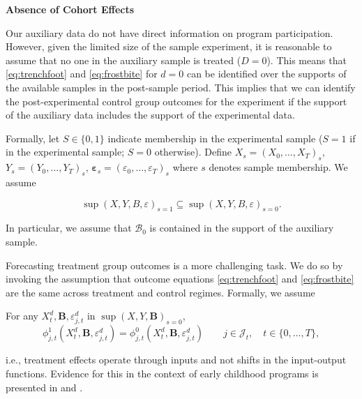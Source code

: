 \begin{assumption}\label{ass:crotchrot}
\textbf{Absence of Cohort Effects}
\end{assumption}

Our auxiliary data do not have direct information on program participation. However, given the limited size of the sample experiment, it is reasonable to assume that no one in the auxiliary sample is treated ($D=0$). This means that \eqref{eq:trenchfoot} and \eqref{eq:frostbite} for $d=0$ can be identified over the supports of the available samples in the post-sample period. This implies that we can identify the post-experimental control group outcomes for the experiment if the support of the auxiliary data includes the support of the experimental data. 

Formally, let $S \in \{0,1\}$ indicate membership in the experimental sample ($S=1$ if in the experimental sample; $S=0$ otherwise). Define $X_s = (X_0,\dots,X_T)_s$, $Y_s = (Y_0,\dots,Y_T)_s$, $\bm{\varepsilon}_s = (\varepsilon_0,\dots,\varepsilon_{T})_s$ where $s$ denotes sample membership. We assume

\begin{assumption} \label{ass:contain}
\begin{equation*}
\sup(X, Y, B, \varepsilon)_{s=1} \subseteq \sup (X, Y, B, \varepsilon)_{s=0}.
\end{equation*}
\end{assumption}
In particular, we assume that $\mathcal{B}_0$ is contained in the support of the auxiliary sample.

Forecasting treatment group outcomes is a more challenging task. We do so by invoking the assumption that outcome equations \eqref{eq:trenchfoot} and \eqref{eq:frostbite} are the same across treatment and control regimes. Formally, we assume

\renewcommand\theassumption{A--\arabic{assumption}(a)}
\begin{assumption}\label{ass:eczema}
For any $X^d_t, \bm{B}, \varepsilon^d_{j,t}$ in $\sup(X,Y,\bm{B})_{s=0}$,
\begin{equation*}
\phi^1_{j,t} (X^d_t, \bm{B}, \varepsilon^d_{j,t}) = \phi^0_{j,t} (X^d_t, \bm{B}, \varepsilon^d_{j,t}) \qquad j \in \mathcal J_t, \quad t \in \{0,\dots,T\},
\end{equation*}
\end{assumption}
i.e., treatment effects operate through inputs and not shifts in the input-output functions. Evidence for this in the context of early childhood programs is presented in \citet{Heckman_Pinto_etal_2013_PerryFactor} and \citet{Attanasio-etal_2015_NBER_Estimating-Production}.

